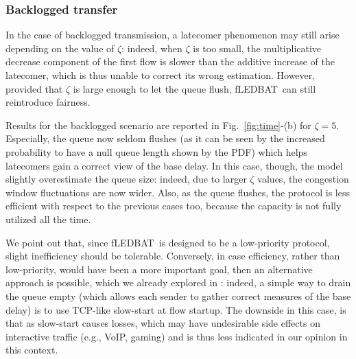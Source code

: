 \documentclass[conference]{IEEEtran}
\newcommand{\figR}[1]{Fig.~\ref{fig:#1}}
\newcommand{\figLC}[2]{
        \caption{#2}
        \label{fig:#1}
        \vspace{-5pt}
}
\newcommand{\btledbat}[0]{LEDBAT}
\newcommand{\fledbat}[0]{fLEDBAT}
\begin{document}
\begin{figure*}[t]
    \begin{center}
       \figLC{sens}{Sensitivity analysis to $\zeta$: Efficiency, long-term fairness and protocol breakdown of a \fledbat\ flow sharing the bottleneck with (a) a TCP flow, (b) a \btledbat\ flow (c) another \fledbat\ flow.}
    \end{center}
\vspace{-4mm}
\end{figure*}



\subsubsection{Backlogged transfer}

In the case of backlogged transmission, a latecomer phenomenon may still arise depending on the value of $\zeta$: indeed, when $\zeta$ is too small, the multiplicative decrease component of the first flow is slower than the additive increase of the latecomer, which is thus unable to correct its wrong estimation.
However, provided that $\zeta$ is large enough to let the queue flush, \fledbat\ can still reintroduce fairness.

Results for the backlogged scenario are reported in \figR{time}-(b) for
$\zeta=5$. Especially, the queue now seldom flushes (as it can be seen by the
increased probability to have a null queue length shown by the PDF)  which helps
latecomers gain a correct view of the base delay. In this case, though, the
model slightly overestimate the queue size: indeed, due to larger $\zeta$
values, the congestion window fluctuations are now wider. Also, as the queue
flushes, the protocol is less efficient with respect to the previous cases too,
because the capacity is not fully utilized all the time.

We point out that, since \fledbat\ is designed to be a low-priority protocol,
slight inefficiency should be tolerable. Conversely, in case efficiency, rather
than low-priority, would have been a more important goal, then an alternative
approach is possible, which we already explored in \cite{icccn10}: indeed, a
simple way to drain the queue empty (which allows each sender to gather correct
measures of the base delay) is to use TCP-like slow-start at flow startup. The
downside in this case, is that as slow-start causes losses, which may have
undesirable side effects on interactive traffic (e.g., VoIP, gaming) and is thus
less indicated in our opinion in this context.
\end{document}
